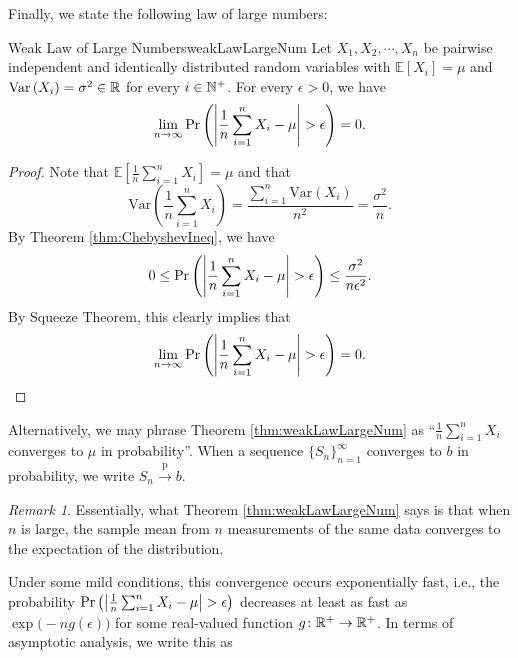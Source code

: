 \documentclass[math, code]{amznotes}
\theoremstyle{remark}
\newtheorem*{remark}{Remark}
\begin{document}
Finally, we state the following law of large numbers:
\begin{thmbox}{Weak Law of Large Numbers}{weakLawLargeNum}
    Let $X_1, X_2, \cdots, X_n$ be pairwise independent and identically distributed random variables with $\mathbb{E}[X_i] = \mu$ and $\mathrm{Var}\left(X_i\right) = \sigma^2 \in \mathbb{R}$ for every $i \in \mathbb{N}^+$. For every $\epsilon > 0$, we have 
    \begin{equation*}
        \lim_{n \to \infty}\mathrm{Pr}\left({\left\lvert {\frac{1}{n}\sum_{i = 1}^nX_i - \mu} \right\rvert} > \epsilon\right) = 0.
    \end{equation*}
    \tcblower
    \begin{proof}
        Note that $\mathbb{E}\left[\frac{1}{n}\sum_{i = 1}^nX_i\right] = \mu$ and that 
        \begin{equation*}
            \mathrm{Var}\left(\frac{1}{n}\sum_{i = 1}^nX_i\right) = \frac{\sum_{i = 1}^{n}\mathrm{Var}\left(X_i\right)}{n^2} = \frac{\sigma^2}{n}.
        \end{equation*}
        By Theorem \ref{thm:ChebyshevIneq}, we have 
        \begin{equation*}
            0 \leq \mathrm{Pr}\left({\left\lvert {\frac{1}{n}\sum_{i = 1}^nX_i - \mu} \right\rvert} > \epsilon\right) \leq \frac{\sigma^2}{n\epsilon^2}.
        \end{equation*}
        By Squeeze Theorem, this clearly implies that 
        \begin{equation*}
            \lim_{n \to \infty}\mathrm{Pr}\left({\left\lvert {\frac{1}{n}\sum_{i = 1}^nX_i - \mu} \right\rvert} > \epsilon\right) = 0.
        \end{equation*}
    \end{proof}
\end{thmbox}
Alternatively, we may phrase Theorem \ref{thm:weakLawLargeNum} as ``$\frac{1}{n}\sum_{i = 1}^nX_i$ converges to $\mu$ in probability''. When a sequence $\{S_n\}_{n = 1}^{\infty}$ converges to $b$ in probability, we write $S_n \xrightarrow{\mathrm{p}} b$. 
\begin{notebox}
    \begin{remark}
        Essentially, what Theorem \ref{thm:weakLawLargeNum} says is that when $n$ is large, the sample mean from $n$ measurements of the same data converges to the expectation of the distribution.
    \end{remark}
\end{notebox}
Under some mild conditions, this convergence occurs exponentially fast, i.e., the probability $\mathrm{Pr}\left({\left\lvert {\frac{1}{n}\sum_{i = 1}^nX_i - \mu} \right\rvert} > \epsilon\right)$ decreases at least as fast as $\exp\bigl(-ng\left(\epsilon\right)\bigr)$ for some real-valued function $g \colon \mathbb{R}^+ \to \mathbb{R}^+$. In terms of asymptotic analysis, we write this as 
\end{document}
